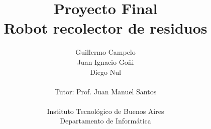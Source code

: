 \documentclass[a4paper,10pt]{article}
\title{Proyecto Final\\Robot recolector de residuos}
\author{Guillermo Campelo\\Juan Ignacio Go\~ni\\Diego Nul\\ \\Tutor: Prof. Juan Manuel Santos\\ \\Instituto Tecnol\'ogico de Buenos Aires\\Departamento de Inform\'atica}
\begin{document}
\maketitle



\newpage

\tableofcontents

\newpage

\listoftables

\newpage

\listoffigures

\newpage



\newpage



\newpage



\newpage



\newpage



\newpage



\newpage



\nocite{*}
\end{document}
